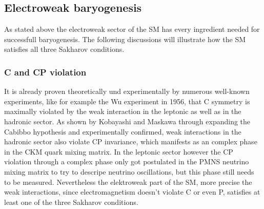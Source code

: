 \subsection{Electroweak baryogenesis}
As stated above the electroweak sector of the SM has every ingredient needed for successfull baryogenesis. The following discussions will illustrate how the SM satisfies all three Sakharov conditions.
\subsubsection{C and CP violation}
It is already proven theoretically und experimentally by numerous well-known experiments, like for example the Wu experiment in 1956, that C symmetry is maximally violated by the weak interaction in the leptonic as well as in the hadronic sector. As shown by Kobayashi and Maskawa through expanding the Cabibbo hypothesis and experimentally confirmed, weak interactions in the hadronic sector also violate CP invariance, which manifests as an complex phase in the CKM quark mixing matrix. In the leptonic sector however the CP violation through a complex phase only got postulated in the PMNS neutrino mixing matrix to try to descripe neutrino oscillations, but this phase still needs to be measured.\newline
Nevertheless the elektroweak part of the SM, more precise the weak interactions, since electromagnetism doesn't violate C or even P, satisfies at least one of the three Sakharov conditions.\newline
